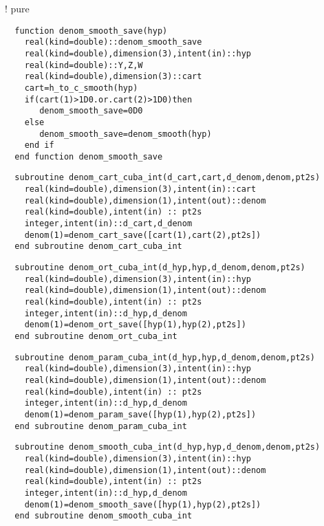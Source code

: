 !  pure 
\begin{Verbatim}
  function denom_smooth_save(hyp)
    real(kind=double)::denom_smooth_save
    real(kind=double),dimension(3),intent(in)::hyp
    real(kind=double)::Y,Z,W
    real(kind=double),dimension(3)::cart
    cart=h_to_c_smooth(hyp)
    if(cart(1)>1D0.or.cart(2)>1D0)then
       denom_smooth_save=0D0
    else
       denom_smooth_save=denom_smooth(hyp)
    end if
  end function denom_smooth_save
\end{Verbatim}

\begin{Verbatim}
  subroutine denom_cart_cuba_int(d_cart,cart,d_denom,denom,pt2s)
    real(kind=double),dimension(3),intent(in)::cart
    real(kind=double),dimension(1),intent(out)::denom
    real(kind=double),intent(in) :: pt2s
    integer,intent(in)::d_cart,d_denom
    denom(1)=denom_cart_save([cart(1),cart(2),pt2s])
  end subroutine denom_cart_cuba_int
\end{Verbatim}

\begin{Verbatim}
  subroutine denom_ort_cuba_int(d_hyp,hyp,d_denom,denom,pt2s)
    real(kind=double),dimension(3),intent(in)::hyp
    real(kind=double),dimension(1),intent(out)::denom
    real(kind=double),intent(in) :: pt2s
    integer,intent(in)::d_hyp,d_denom
    denom(1)=denom_ort_save([hyp(1),hyp(2),pt2s])
  end subroutine denom_ort_cuba_int
\end{Verbatim}

\begin{Verbatim}
  subroutine denom_param_cuba_int(d_hyp,hyp,d_denom,denom,pt2s)
    real(kind=double),dimension(3),intent(in)::hyp
    real(kind=double),dimension(1),intent(out)::denom
    real(kind=double),intent(in) :: pt2s
    integer,intent(in)::d_hyp,d_denom
    denom(1)=denom_param_save([hyp(1),hyp(2),pt2s])
  end subroutine denom_param_cuba_int
\end{Verbatim}

\begin{Verbatim}
  subroutine denom_smooth_cuba_int(d_hyp,hyp,d_denom,denom,pt2s)
    real(kind=double),dimension(3),intent(in)::hyp
    real(kind=double),dimension(1),intent(out)::denom
    real(kind=double),intent(in) :: pt2s
    integer,intent(in)::d_hyp,d_denom
    denom(1)=denom_smooth_save([hyp(1),hyp(2),pt2s])
  end subroutine denom_smooth_cuba_int
\end{Verbatim}


